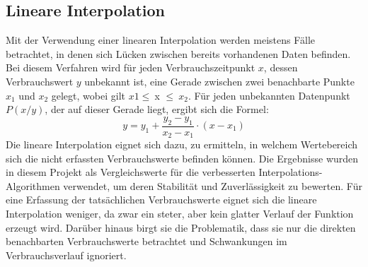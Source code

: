 \label{sec:easy_algorithms}


\subsection{Lineare Interpolation}

Mit der Verwendung einer linearen Interpolation werden meistens Fälle betrachtet, in denen sich Lücken zwischen bereits vorhandenen Daten befinden. Bei diesem Verfahren wird für jeden Verbrauchszeitpunkt $x$, dessen Verbrauchswert $y$ unbekannt ist, eine Gerade zwischen zwei benachbarte Punkte $x_1$ und $x_2$ gelegt, wobei gilt $x1\leq\ $x $\leq \ x_2$. Für jeden unbekannten Datenpunkt $P(x/y)$, der auf dieser Gerade liegt, ergibt sich die Formel:
$$y = y_1 + \frac{y_2 - y_1}{x_2 - x_1} \cdot (x - x_1)$$
Die lineare Interpolation eignet sich dazu, zu ermitteln, in welchem Wertebereich sich die nicht erfassten Verbrauchswerte befinden können. Die Ergebnisse wurden in diesem Projekt als Vergleichswerte für die verbesserten Interpolations-Algorithmen verwendet, um deren Stabilität und Zuverlässigkeit zu bewerten. Für eine Erfassung der tatsächlichen Verbrauchswerte eignet sich die lineare Interpolation weniger, da zwar ein steter, aber kein glatter Verlauf der Funktion erzeugt wird. Darüber hinaus birgt sie die Problematik, dass sie nur die direkten benachbarten Verbrauchswerte betrachtet und Schwankungen im Verbrauchsverlauf ignoriert.

